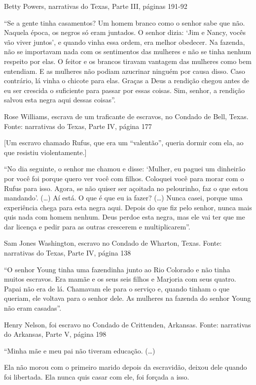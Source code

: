 Betty Powers, narrativas do Texas, Parte III, páginas 191-92

``Se a gente tinha casamentos? Um homem branco como o senhor sabe que
não. Naquela época, os negros só eram juntados. O senhor dizia: `Jim e
Nancy, vocês vão viver juntos', e quando vinha essa ordem, era melhor
obedecer. Na fazenda, não se importavam nada com os sentimentos das
mulheres e não se tinha nenhum respeito por elas. O feitor e os brancos
tiravam vantagem das mulheres como bem entendiam. E as mulheres não
podiam azucrinar ninguém por causa disso. Caso contrário, lá vinha o
chicote para elas. Graças a Deus a rendição chegou antes de eu ser
crescida o suficiente para passar por essas coisas. Sim, senhor, a
rendição salvou esta negra aqui dessas coisas''.

Rose Williams, escrava de um traficante de escravos, no Condado de Bell,
Texas. Fonte: narrativas do Texas, Parte IV, página 177

{[}Um escravo chamado Rufus, que era um ``valentão'', queria dormir com
ela, ao que resistiu violentamente.{]}

``No dia seguinte, o senhor me chamou e disse: `Mulher, eu paguei um
dinheirão por você foi porque quero ver você com filhos. Coloquei você
para morar com o Rufus para isso. Agora, se não quiser ser açoitada no
pelourinho, faz o que estou mandando'. (\ldots{}) Aí está. O que é que
eu ia fazer? (\ldots{}) Nunca casei, porque uma experiência chega para
esta negra aqui. Depois do que fiz pelo senhor, nunca mais quis nada com
homem nenhum. Deus perdoe esta negra, mas ele vai ter que me dar licença
e pedir para as outras crescerem e multiplicarem''.

Sam Jones Washington, escravo no Condado de Wharton, Texas. Fonte:
narrativas do Texas, Parte IV, página 138

``O senhor Young tinha uma fazendinha junto ao Rio Colorado e não tinha
muitos escravos. Era mamãe e os seus seis filhos e Marjoria com seus
quatro. Papai não era de lá. Chamavam ele para o serviço e, quando
tinham o que queriam, ele voltava para o senhor dele. As mulheres na
fazenda do senhor Young não eram casadas''.

Henry Nelson, foi escravo no Condado de Crittenden, Arkansas. Fonte:
narrativas do Arkansas, Parte V, página 198

``Minha mãe e meu pai não tiveram educação. (\ldots{})

Ela não morou com o primeiro marido depois da escravidão, deixou dele
quando foi libertada. Ela nunca quis casar com ele, foi forçada a isso.

